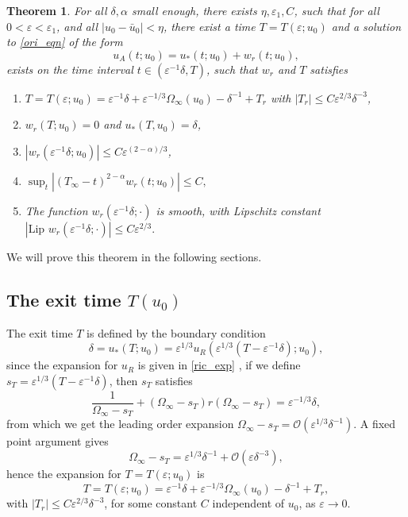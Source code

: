 \documentclass[letterpaper,11pt]{article}
\newcommand{\rmO}{\mathcal{O}}
\newcommand{\eps}{\varepsilon}
\numberwithin{equation}{section}
\theoremstyle{plain}
\newtheorem{theorem}{Theorem}[section]
\begin{document}
\begin{theorem}\label{thm_r}
For all $\delta, \alpha$ small enough, there exists $\eta,\eps_1,C$, such that for all $0<\eps <\eps_1$, and all $|u_0 - \bar{u}_0|<\eta$, there exist a time $T=T(\eps;u_0)$ and a solution to \eqref{ori_eqn} of the form
\[
u_A(t;u_0) = u_*(t; u_0) + w_r(t; u_0),
\]
exists on the time interval $t \in (\eps^{-1}\delta, T)$, such that $w_r$ and $T$ satisfies
\begin{enumerate}[label=\textnormal{(\arabic*)}]
\item \label{thm_r_1}$T=T(\eps;u_0) = \eps^{-1}\delta+\eps^{-1/3}\Omega_\infty(u_0)-\delta^{-1}+T_r$ with $|T_r|\le C\eps^{2/3}\delta^{-3}$,
\item \label{thm_r_2} $w_r(T; u_0) = 0$ and $u_*(T,u_0)=\delta$,
\item \label{thm_r_3} $|w_r(\eps^{-1}\delta; u_0)| \le C\eps^{(2-\alpha)/3}$,

\item \label{thm_r_4} $\sup_{t} |(T_\infty-t)^{2-\alpha} w_r(t; u_0)| \le C,$

\item \label{thm_r_5} The function $w_r(\eps^{-1}\delta; \cdot)$ is smooth, with Lipschitz constant  $|\text{Lip }w_r(\eps^{-1}\delta; \cdot) |\le C\eps^{2/3} . $

\end{enumerate}

\end{theorem}

We will prove this theorem in the following sections.
\subsection{The exit time \texorpdfstring{$T(u_0)$}{T(u_0)}}\label{exit_time}
The exit time $T$ is defined by the boundary condition 
\[
\delta = u_*(T; u_0) = \eps^{1/3}u_R(\eps^{1/3}(T-\eps^{-1}\delta); u_0),
\]
since the expansion for $u_R$ is given in \eqref{ric_exp} , if we define $s_T = \eps^{1/3}(T-\eps^{-1}\delta)$, then $s_T$ satisfies
\[
\frac{1}{\Omega_\infty-s_T} + (\Omega_\infty-s_T)r(\Omega_\infty-s_T) = \eps^{-1/3}\delta,
\]
from which we get the leading order expansion $\Omega_\infty-s_T = \rmO(\eps^{1/3}\delta^{-1})$. A fixed point argument gives
\[
\Omega_\infty - s_T = \eps^{1/3}\delta^{-1} + \rmO(\eps \delta^{-3}),
\]
hence the expansion for $T=T(\eps; u_0)$ is
\begin{equation}\label{T_exp}
T = T(\eps;u_0) = \eps^{-1}\delta + \eps^{-1/3}\Omega_\infty(u_0) - \delta^{-1} + T_r,
\end{equation}
with 
$|T_r|\le C\eps^{2/3}\delta^{-3}$, for some constant $C$ independent of $u_0$, as $\eps \to 0$.
\end{document}
